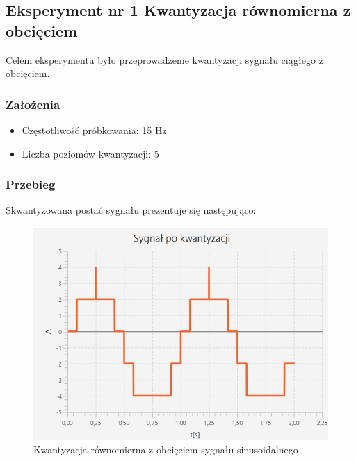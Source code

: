 \documentclass[12pt]{article}
\begin{document}
\subsection{Eksperyment nr 1 Kwantyzacja równomierna z obcięciem}

Celem eksperymentu było przeprowadzenie kwantyzacji sygnału ciągłego z obcięciem.

\subsubsection{Założenia}

\begin{itemize}
    \item Częstotliwość próbkowania: 15 Hz
    \item Liczba poziomów kwantyzacji: 5
\end{itemize}
\subsubsection{Przebieg}
Skwantyzowana postać sygnału prezentuje się następująco:
\begin{figure}[H]
    \centering
	\includegraphics[width=\linewidth]{kwantyzacja_z_obcieciem.jpg}
    \caption{Kwantyzacja równomierna z obcięciem sygnału sinusoidalnego}
    \label{wykres dla eksperymentu 1.1}
\end{figure}
\end{document}
